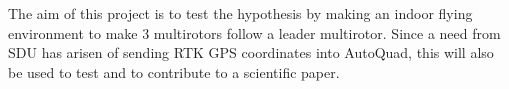 The aim of this project is to test the hypothesis by making an indoor flying environment to make 3 multirotors follow a leader multirotor. Since a need from SDU has arisen of sending RTK GPS coordinates into AutoQuad, this will also be used to test and to contribute to a scientific paper.